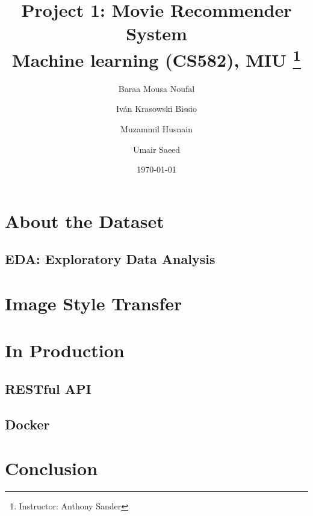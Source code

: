 \documentclass[titlepage, 11pt]{article}
\title{
	\textbf{Project 1: Movie Recommender System} \\
	Machine learning (CS582), MIU \thanks{Instructor: Anthony Sander}
}
\author{
    Baraa Mousa Noufal \and Iván Krasowski Bissio
        \and Muzammil Husnain \and Umair Saeed
}
\date{\today}
\begin{document}
\maketitle
\tableofcontents

\begin{abstract}
	
\end{abstract}

\section{About the Dataset}

\subsection{EDA: Exploratory Data Analysis}


\section{Image Style Transfer}


\section{In Production}
\subsection{RESTful API}

\subsection{Docker}

\clearpage
\section{Conclusion}

\end{document}
